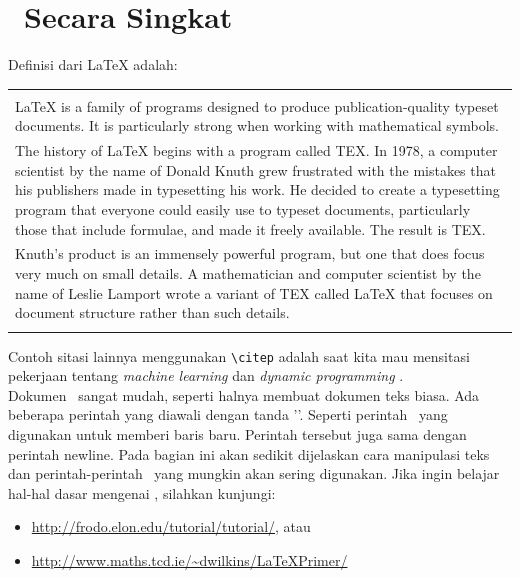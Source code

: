 \section{\latex~Secara Singkat}
Definisi dari LaTeX \citep{lankton2008introduction} adalah: \\ 
\begin{tabular}{| p{13cm} |}
	\hline 
	\\
	LaTeX is a family of programs designed to produce publication-quality 
	typeset documents. It is particularly strong when working with 
	mathematical symbols. \\	
	The history of LaTeX begins with a program called TEX. In 1978, a 
	computer scientist by the name of Donald Knuth grew frustrated with the 
	mistakes that his publishers made in typesetting his work. He decided 
	to create a typesetting program that everyone could easily use to 
	typeset documents, particularly those that include formulae, and made 
	it freely available. The result is TEX. \\	
	Knuth's product is an immensely powerful program, but one that does 
	focus very much on small details. A mathematician and computer 
	scientist by the name of Leslie Lamport wrote a variant of TEX called 
	LaTeX that focuses on document structure rather than such details. \\
	\\
	\hline
\end{tabular}

\vspace*{0.8cm}

Contoh sitasi lainnya menggunakan \verb|\citep| adalah saat kita mau mensitasi pekerjaan tentang \textit{machine learning} \citep{chin2000learning} dan \textit{dynamic programming} \citep{barto1995learning}. \\

Dokumen \latex~sangat mudah, seperti halnya membuat dokumen teks biasa. Ada 
beberapa perintah yang diawali dengan tanda '\bslash'. 
Seperti perintah \bslash\bslash~yang digunakan untuk memberi baris baru. 
Perintah tersebut juga sama dengan perintah \bslash newline. 
Pada bagian ini akan sedikit dijelaskan cara manipulasi teks dan 
perintah-perintah \latex~yang mungkin akan sering digunakan. 
Jika ingin belajar hal-hal dasar mengenai \latex, silahkan kunjungi: 

\begin{itemize}
	\item \url{http://frodo.elon.edu/tutorial/tutorial/}, atau
	\item \url{http://www.maths.tcd.ie/~dwilkins/LaTeXPrimer/}
\end{itemize}


